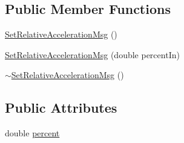 \subsection*{Public Member Functions}
\begin{DoxyCompactItemize}
\item 
\hyperlink{class_set_relative_acceleration_msg_a72e7159bb7d796efe10efd334a762dfd}{SetRelativeAccelerationMsg} ()
\item 
\hyperlink{class_set_relative_acceleration_msg_adb9e5be2cd4c5ceacb205f42c95e52ec}{SetRelativeAccelerationMsg} (double percentIn)
\item 
\hyperlink{class_set_relative_acceleration_msg_ae1f2d7c31645bc5fc6c1ff29ccc0a32d}{$\sim$SetRelativeAccelerationMsg} ()
\end{DoxyCompactItemize}
\subsection*{Public Attributes}
\begin{DoxyCompactItemize}
\item 
double \hyperlink{class_set_relative_acceleration_msg_aef5826b5691c594b8180746f3983cabb}{percent}
\end{DoxyCompactItemize}


